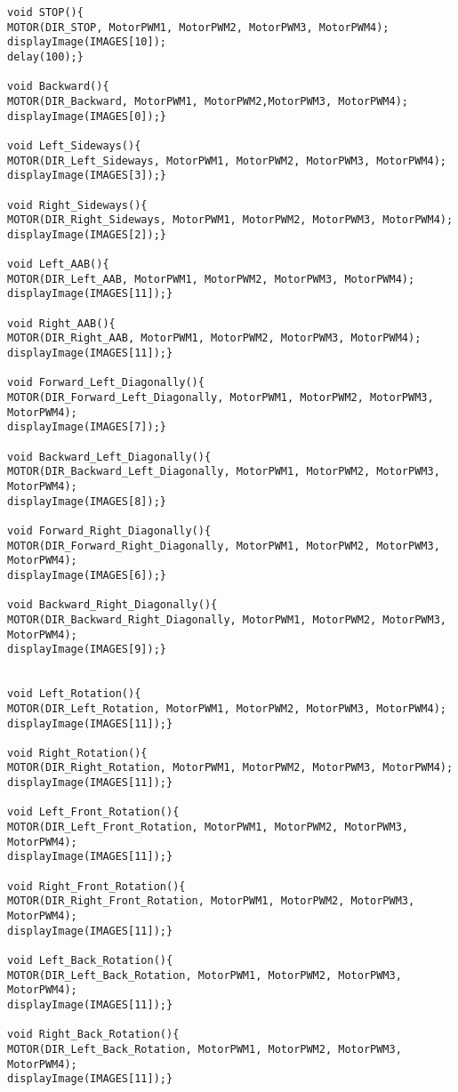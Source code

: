 \begin{lstlisting}
void STOP(){
MOTOR(DIR_STOP, MotorPWM1, MotorPWM2, MotorPWM3, MotorPWM4);
displayImage(IMAGES[10]);
delay(100);}

void Backward(){
MOTOR(DIR_Backward, MotorPWM1, MotorPWM2,MotorPWM3, MotorPWM4);
displayImage(IMAGES[0]);}

void Left_Sideways(){
MOTOR(DIR_Left_Sideways, MotorPWM1, MotorPWM2, MotorPWM3, MotorPWM4);
displayImage(IMAGES[3]);}

void Right_Sideways(){
MOTOR(DIR_Right_Sideways, MotorPWM1, MotorPWM2, MotorPWM3, MotorPWM4);
displayImage(IMAGES[2]);}

void Left_AAB(){
MOTOR(DIR_Left_AAB, MotorPWM1, MotorPWM2, MotorPWM3, MotorPWM4);
displayImage(IMAGES[11]);}

void Right_AAB(){
MOTOR(DIR_Right_AAB, MotorPWM1, MotorPWM2, MotorPWM3, MotorPWM4);
displayImage(IMAGES[11]);}

void Forward_Left_Diagonally(){
MOTOR(DIR_Forward_Left_Diagonally, MotorPWM1, MotorPWM2, MotorPWM3, MotorPWM4);
displayImage(IMAGES[7]);}

void Backward_Left_Diagonally(){
MOTOR(DIR_Backward_Left_Diagonally, MotorPWM1, MotorPWM2, MotorPWM3, MotorPWM4);
displayImage(IMAGES[8]);}

void Forward_Right_Diagonally(){
MOTOR(DIR_Forward_Right_Diagonally, MotorPWM1, MotorPWM2, MotorPWM3, MotorPWM4);
displayImage(IMAGES[6]);}

void Backward_Right_Diagonally(){
MOTOR(DIR_Backward_Right_Diagonally, MotorPWM1, MotorPWM2, MotorPWM3, MotorPWM4);
displayImage(IMAGES[9]);}


void Left_Rotation(){
MOTOR(DIR_Left_Rotation, MotorPWM1, MotorPWM2, MotorPWM3, MotorPWM4);
displayImage(IMAGES[11]);}

void Right_Rotation(){
MOTOR(DIR_Right_Rotation, MotorPWM1, MotorPWM2, MotorPWM3, MotorPWM4);
displayImage(IMAGES[11]);}

void Left_Front_Rotation(){
MOTOR(DIR_Left_Front_Rotation, MotorPWM1, MotorPWM2, MotorPWM3, MotorPWM4);
displayImage(IMAGES[11]);}

void Right_Front_Rotation(){
MOTOR(DIR_Right_Front_Rotation, MotorPWM1, MotorPWM2, MotorPWM3, MotorPWM4);
displayImage(IMAGES[11]);}

void Left_Back_Rotation(){
MOTOR(DIR_Left_Back_Rotation, MotorPWM1, MotorPWM2, MotorPWM3, MotorPWM4);
displayImage(IMAGES[11]);}

void Right_Back_Rotation(){
MOTOR(DIR_Left_Back_Rotation, MotorPWM1, MotorPWM2, MotorPWM3, MotorPWM4);
displayImage(IMAGES[11]);}


\end{lstlisting}
